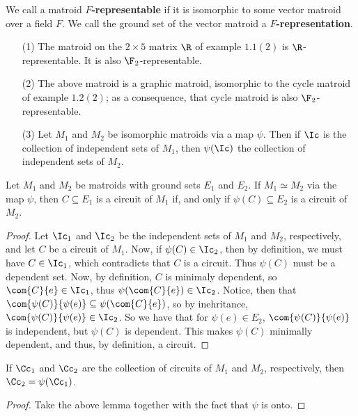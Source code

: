 \begin{definition}
    We call a matroid \textbf{$F$-representable} if it is isomorphic to some
    vector matroid over a field  $F$. We call the ground set of the vector
    matroid a \textbf{$F$-representation}.
\end{definition}

\begin{example}\label{1.7}
    \begin{enumerate}
        \item[(1)] The matroid on the $2 \times 5$ matrix $\R$ of example
            $1.1(2)$ is $\R$-representable. It is also $\F_2$-representable.

        \item [(2)] The above matroid is a graphic matroid, isomorphic to the
            cycle matroid of example $1.2(2)$; as a consequence, that cycle
            matroid is also $\F_2$-representable.

        \item[(3)] Let $M_1$ and $M_2$ be isomorphic matroids via a map $\psi$.
            Then if  $\Ic$ is the collection of independent sets of $M_1$,
            then $\psi(\Ic)$ the collection of independent sets of $M_2$.
    \end{enumerate}
\end{example}

\begin{lemma}\label{1.1.4}
    Let $M_1$ and $M_2$ be matroids with ground sets $E_1$ and $E_2$. If $M_1
    \simeq M_2$ via the map $\psi$, then $C \subseteq E_1$ is a circuit of $M_1$
    if, and only if $\psi(C) \subseteq E_2$ is a circuit of $M_2$.
\end{lemma}
\begin{proof}
    Let $\Ic_1$ and $\Ic_2$ be the independent sets of $M_1$ and $M_2$,
    respectively, and let $C$ be a circuit of  $M_1$. Now, if $\psi(C) \in
    \Ic_2$, then by definition, we must have $C \in \Ic_1$, which contradicts
    that $C$ is a circuit. Thus  $\psi(C)$ must be a dependent set. Now, by
    definition, $C$ is minimaly dependent, so  $\com{C}{e} \in \Ic_1$, thus
    $\psi(\com{C}{e}) \in \Ic_2$. Notice, then that $\com{\psi(C)}{\psi(e)}
    \subseteq \psi(\com{C}{e})$, so by inehritance, $\com{\psi(C)}{\psi(e)} \in
    \Ic_2$. So we have that for $\psi(e) \in E_2$, $\com{\psi(C)}{\psi(e)}$ is
    independent, but $\psi(C)$ is dependent. This makes $\psi(C)$ minimally
    dependent, and thus, by definition, a circuit.
\end{proof}
\begin{corollary}
    If $\Cc_1$ and $\Cc_2$ are the collection of circuits of $M_1$ and $M_2$,
    respectively, then $\Cc_2=\psi(\Cc_1)$.
\end{corollary}
\begin{proof}
    Take the above lemma together with the fact that $\psi$ is onto.
\end{proof}

